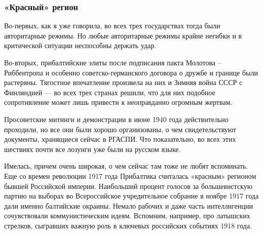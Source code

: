  
 
 
 
 

\clearpage
\subsubsection{«Красный» регион}


Во-первых, как я уже говорила, во всех трех государствах тогда были
авторитарные режимы. Но любые авторитарные режимы крайне негибки и в
критической ситуации неспособны держать удар.

Во-вторых, прибалтийские элиты после подписания пакта Молотова – Риббентропа и
особенно советско-германского договора о дружбе и границе были растеряны.
Тягостное впечатление произвела на них и Зимняя война СССР с Финляндией — во
всех трех странах решили, что для них подобное сопротивление может лишь
привести к неоправданно огромным жертвам.


Просоветские митинги и демонстрации в июне 1940 года действительно проходили,
но все они были хорошо организованы, о чем свидетельствуют документы,
хранящиеся сейчас в РГАСПИ. Что показательно, во всех этих шествиях почти все
лозунги уже были на русском языке.


Имелась, причем очень широкая, о чем сейчас там тоже не любят вспоминать. Еще
со времен революции 1917 года Прибалтика считалась «красным» регионом бывшей
Российской империи. Наибольший процент голосов за большевистскую партию на
выборах во Всероссийское учредительное собрание в ноябре 1917 года дали именно
балтийские окраины. Немало рабочих и даже часть интеллигенции сочувствовали
коммунистическим идеям. Вспомним, например, про латышских стрелков, сыгравших
важную роль в ключевых российских событиях 1918 года.


